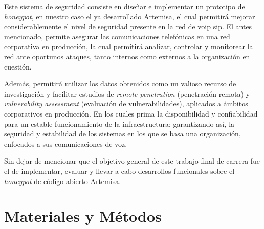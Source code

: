 \documentclass[a4paper,12pt]{report}
\begin{document}
Este sistema de seguridad consiste en diseñar e implementar un prototipo
de \emph{honeypot}, en nuestro caso el ya desarrollado Artemisa, el cual
permitirá mejorar considerablemente el nivel de seguridad presente en la red de \ac{voip} \ac{sip}.
El antes mencionado, permite asegurar  las comunicaciones telefónicas en
una red corporativa en producción, la cual permitirá analizar, controlar
y monitorear la red ante oportunos ataques, tanto internos como externos
a la organización en cuestión.

Además, permitirá utilizar los datos obtenidos como un valioso recurso
de investigación y facilitar estudios de \emph{remote penetration}
(penetración remota) y \emph{vulnerability assessment} (evalua\-ción de
vulnerabilidades), aplicados a ámbitos corporativos en producción. En
los cuales prima la disponibilidad y confiabilidad para un estable
funcionamiento de la infraestructura; garantizando así, la seguridad y
estabilidad de los sistemas en los que se basa una organización,
enfocados a sus comunicaciones de voz.

Sin dejar de mencionar que el objetivo general de este trabajo final de carrera fue el de implementar, evaluar y llevar a cabo
desarrollos funcionales sobre el \emph{honeypot} de código abierto Artemisa.\\

\chapter{Materiales y M\'etodos}
\end{document}
